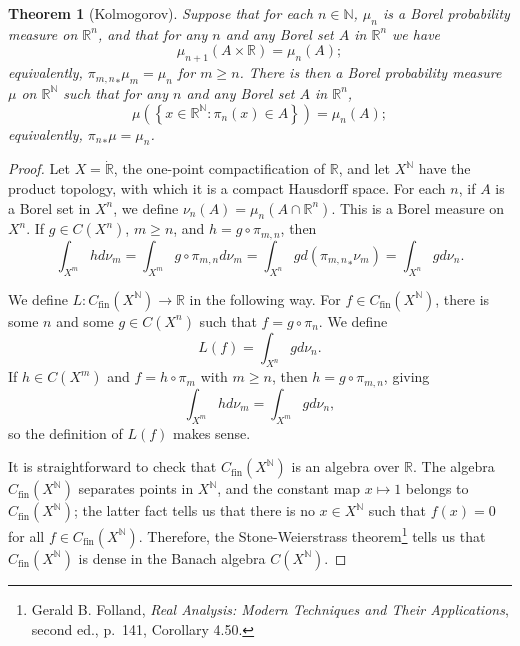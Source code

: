 \documentclass{article}
\newtheorem{theorem}{Theorem}
\theoremstyle{definition}
\begin{document}
\begin{theorem}[Kolmogorov]
Suppose that for each $n \in \mathbb{N}$, $\mu_n$ is a Borel probability measure on $\mathbb{R}^n$, and that for any $n$ and any Borel set $A$ in $\mathbb{R}^n$ we have
\[
\mu_{n+1}(A \times \mathbb{R}) = \mu_n(A);
\]
equivalently, ${\pi_{m,n}}_* \mu_m=\mu_n$ for $m \geq n$.
There is then a Borel probability measure $\mu$ on $\mathbb{R}^{\mathbb{N}}$ such that for any $n$ and any Borel set $A$
in $\mathbb{R}^n$,
\[
\mu\left( \left\{ x \in \mathbb{R}^\mathbb{N}: \pi_n(x) \in A\right\}\right)=\mu_n(A);
\]
equivalently, ${\pi_n}_* \mu = \mu_n$.
\end{theorem}
\begin{proof}
Let $X=\dot{\mathbb{R}}$, the one-point compactification of $\mathbb{R}$, and let $X^\mathbb{N}$ have the product topology, with which it is a compact Hausdorff space.
 For each $n$, if $A$ is a Borel set in $X^n$, we define $\nu_n(A) = \mu_n(A \cap \mathbb{R}^n)$. This is a Borel
measure on $X^n$. If $g \in C(X^n)$, $m \geq n$, and $h=g \circ \pi_{m,n}$, then
\[
\int_{X^m} h d\nu_m=\int_{X^m} g\circ \pi_{m,n} d\nu_m=\int_{X^n} g d({\pi_{m,n}}_* \nu_m)=\int_{X^n} g d\nu_n.
\]


We define $L:C_{\mathrm{fin}}(X^\mathbb{N}) \to \mathbb{R}$ in the following way.
For $f \in C_{\mathrm{fin}}(X^\mathbb{N})$, there is some $n$ and some $g \in C(X^n)$ such that $f=g \circ \pi_n$.
We define
\[
L(f) = \int_{X^n} g d\nu_n.
\]
If $h \in C(X^m)$ and $f=h \circ \pi_m$ with $m \geq n$, then $h=g \circ\pi_{m,n}$, giving
\[
\int_{X^m} h d\nu_m=\int_{X^m} g d\nu_n,
\]
so the definition of $L(f)$ makes sense. 

It is straightforward to check that $C_{\mathrm{fin}}(X^\mathbb{N})$ is an algebra over $\mathbb{R}$. 
The algebra $C_{\mathrm{fin}}(X^\mathbb{N})$ separates points in $X^\mathbb{N}$, and the constant map $x \mapsto 1$ belongs to $C_{\mathrm{fin}}(X^\mathbb{N})$;
the latter fact tells us that there is no $x \in X^\mathbb{N}$ such that $f(x) =0$ for all $f \in C_{\mathrm{fin}}(X^\mathbb{N})$. 
Therefore, the Stone-Weierstrass theorem\footnote{Gerald B. Folland, 
{\em Real Analysis: Modern Techniques and Their Applications}, second ed., p.~141, Corollary 4.50.} tells us that
$C_{\mathrm{fin}}(X^\mathbb{N})$ is dense in the Banach algebra $C(X^\mathbb{N})$. 


\end{proof}
\end{document}
